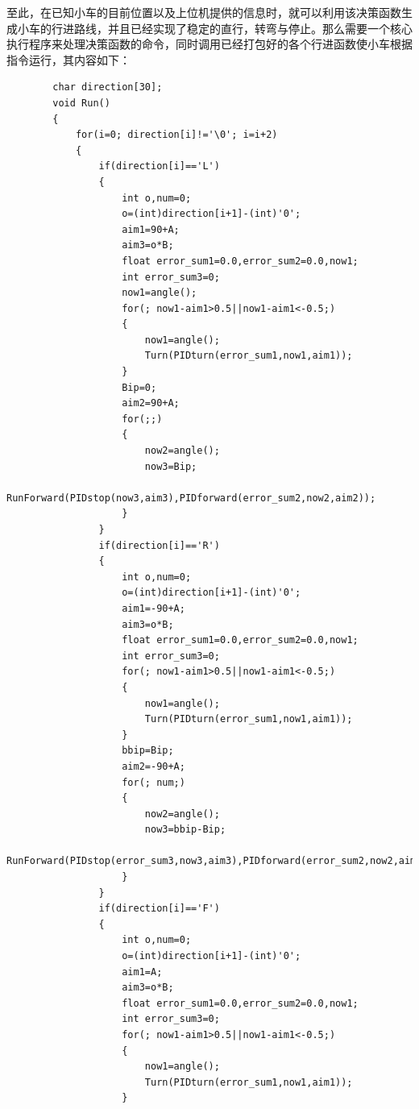 \documentclass[UTF8]{ctexart}
\begin{document}
至此，在已知小车的目前位置以及上位机提供的信息时，就可以利用该决策函数生成小车的行进路线，并且已经实现了稳定的直行，转弯与停止。那么需要一个核心执行程序来处理决策函数的命令，同时调用已经打包好的各个行进函数使小车根据指令运行，其内容如下：
    \begin{lstlisting}
        char direction[30];
        void Run()
        {
            for(i=0; direction[i]!='\0'; i=i+2)
            {
                if(direction[i]=='L')
                {
                    int o,num=0;
                    o=(int)direction[i+1]-(int)'0';
                    aim1=90+A;
                    aim3=o*B;
                    float error_sum1=0.0,error_sum2=0.0,now1;
                    int error_sum3=0;
                    now1=angle();
                    for(; now1-aim1>0.5||now1-aim1<-0.5;)
                    {
                        now1=angle();
                        Turn(PIDturn(error_sum1,now1,aim1));
                    }
                    Bip=0;
                    aim2=90+A;
                    for(;;)
                    {
                        now2=angle();
                        now3=Bip;
                        RunForward(PIDstop(now3,aim3),PIDforward(error_sum2,now2,aim2));
                    }
                }
                if(direction[i]=='R')
                {
                    int o,num=0;
                    o=(int)direction[i+1]-(int)'0';
                    aim1=-90+A;
                    aim3=o*B;
                    float error_sum1=0.0,error_sum2=0.0,now1;
                    int error_sum3=0;
                    for(; now1-aim1>0.5||now1-aim1<-0.5;)
                    {
                        now1=angle();
                        Turn(PIDturn(error_sum1,now1,aim1));
                    }
                    bbip=Bip;
                    aim2=-90+A;
                    for(; num;)
                    {
                        now2=angle();
                        now3=bbip-Bip;
                        RunForward(PIDstop(error_sum3,now3,aim3),PIDforward(error_sum2,now2,aim2));
                    }
                }
                if(direction[i]=='F')
                {
                    int o,num=0;
                    o=(int)direction[i+1]-(int)'0';
                    aim1=A;
                    aim3=o*B;
                    float error_sum1=0.0,error_sum2=0.0,now1;
                    int error_sum3=0;
                    for(; now1-aim1>0.5||now1-aim1<-0.5;)
                    {
                        now1=angle();
                        Turn(PIDturn(error_sum1,now1,aim1));
                    }

\end{lstlisting}
\end{document}
